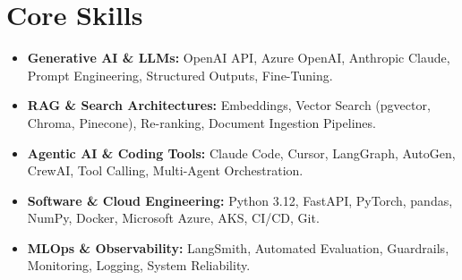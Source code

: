 \documentclass[a4paper,10pt]{article}
\begin{document}
\section{Core Skills}
\begin{itemize}
  \item \textbf{Generative AI \& LLMs:} OpenAI API, Azure OpenAI, Anthropic Claude, Prompt Engineering, Structured Outputs, Fine-Tuning.
  \item \textbf{RAG \& Search Architectures:} Embeddings, Vector Search (pgvector, Chroma, Pinecone), Re-ranking, Document Ingestion Pipelines.
  \item \textbf{Agentic AI \& Coding Tools:} Claude Code, Cursor, LangGraph, AutoGen, CrewAI, Tool Calling, Multi-Agent Orchestration.
  \item \textbf{Software \& Cloud Engineering:} Python 3.12, FastAPI, PyTorch, pandas, NumPy, Docker, Microsoft Azure, AKS, CI/CD, Git.
  \item \textbf{MLOps \& Observability:} LangSmith, Automated Evaluation, Guardrails, Monitoring, Logging, System Reliability.
\end{itemize}
\end{document}

